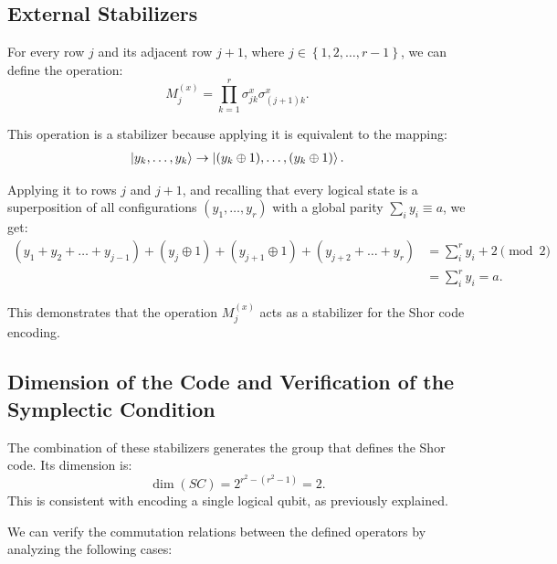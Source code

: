 \subsection{External Stabilizers}

For every row $j$ and its adjacent row $j + 1$, where $j \in \left\{1, 2, \dots, r - 1\right\}$, we can define the operation:
\begin{equation}
  M_j^{(x)} = \prod_{k = 1}^{r}\sigma_{jk}^{x}\sigma_{(j + 1)k}^x
  \label{eq:external_stabilizer}
.\end{equation}
\citep{Cesar2024}

This operation is a stabilizer because applying it is equivalent to the mapping:
\begin{align*}
  \ket{y_k, \ldots, y_k} \to \ket{(y_k \oplus 1), \ldots, (y_k \oplus 1)}
.\end{align*}

Applying it to rows $j$ and $j + 1$, and recalling that every logical state is a superposition of all configurations $(y_1,\dots, y_r)$ with a global parity $\sum_i y_i \equiv a$, we get:
\begin{align*}
  (y_1 + y_2 + \dots + y_{j - 1}) + (y_j \oplus 1) + (y_{j + 1} \oplus 1) + (y_{j + 2} + \dots + y_r) &= \sum_i^r y_i + 2 \pmod{2}\\
  &= \sum_i^r y_i = a
.\end{align*}

This demonstrates that the operation $M_j^{(x)}$ acts as a stabilizer for the Shor code encoding.

\subsection{Dimension of the Code and Verification of the Symplectic Condition}

The combination of these stabilizers generates the group that defines the Shor code. Its dimension is:
\begin{equation}
  \dim(SC) = 2^{r^2 - (r^2 - 1)} = 2
  \label{eq:dim_shor_stabilizer}
.\end{equation}
This is consistent with encoding a single logical qubit, as previously explained.

We can verify the commutation relations between the defined operators by analyzing the following cases:


